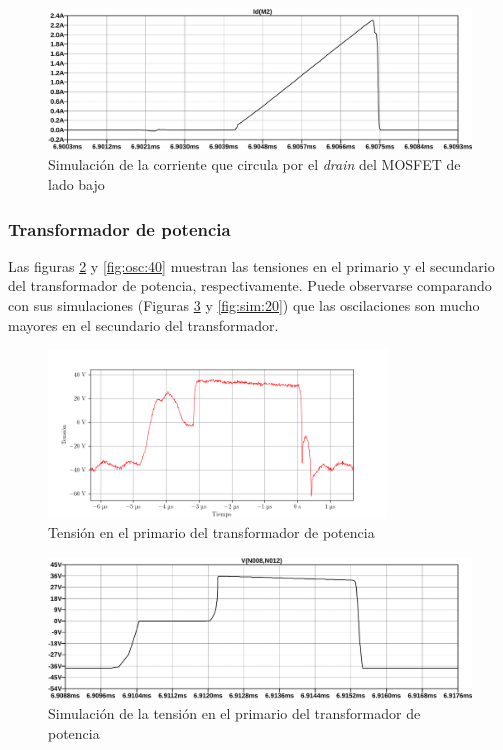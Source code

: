 \begin{figure}[H]
    \centering
    \includegraphics[width=\textwidth]{images/sim/11.pdf}
    \caption{Simulación de la corriente que circula por el \textit{drain} del MOSFET de lado bajo}
    \label{fig:sim:11}
\end{figure}

\subsubsection{Transformador de potencia}

Las figuras \ref{fig:osc:38} y \ref{fig:osc:40} muestran las tensiones en el primario y el secundario del transformador de potencia, respectivamente. Puede observarse comparando con sus simulaciones (Figuras \ref{fig:sim:19} y \ref{fig:sim:20}) que las oscilaciones son mucho mayores en el secundario del transformador.

\begin{figure}[H]
    \centering
    \includegraphics[width=0.8\textwidth]{images/capturas-osciloscopio/17-11-2022/38.png}
    \caption{Tensión en el primario del transformador de potencia}
    \label{fig:osc:38}
\end{figure}

\begin{figure}[H]
    \centering
    \includegraphics[width=\textwidth]{images/sim/19.pdf}
    \caption{Simulación de la tensión en el primario del transformador de potencia}
    \label{fig:sim:19}
\end{figure}

